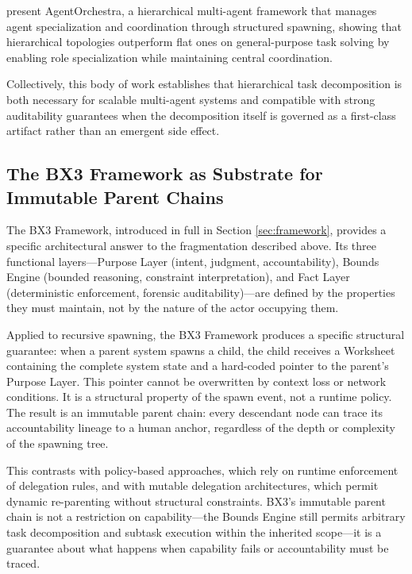  present AgentOrchestra, a hierarchical multi-agent framework that manages agent specialization and coordination through structured spawning, showing that hierarchical topologies outperform flat ones on general-purpose task solving by enabling role specialization while maintaining central coordination.

Collectively, this body of work establishes that hierarchical task decomposition is both necessary for scalable multi-agent systems and compatible with strong auditability guarantees when the decomposition itself is governed as a first-class artifact rather than an emergent side effect.

\subsection{The BX3 Framework as Substrate for Immutable Parent Chains}
\label{sec:bx3-substrate}

The BX3 Framework, introduced in full in Section \ref{sec:framework}, provides a specific architectural answer to the fragmentation described above. Its three functional layers---Purpose Layer (intent, judgment, accountability), Bounds Engine (bounded reasoning, constraint interpretation), and Fact Layer (deterministic enforcement, forensic auditability)---are defined by the properties they must maintain, not by the nature of the actor occupying them.

Applied to recursive spawning, the BX3 Framework produces a specific structural guarantee: when a parent system spawns a child, the child receives a Worksheet containing the complete system state and a hard-coded pointer to the parent's Purpose Layer. This pointer cannot be overwritten by context loss or network conditions. It is a structural property of the spawn event, not a runtime policy. The result is an immutable parent chain: every descendant node can trace its accountability lineage to a human anchor, regardless of the depth or complexity of the spawning tree.

This contrasts with policy-based approaches, which rely on runtime enforcement of delegation rules, and with mutable delegation architectures, which permit dynamic re-parenting without structural constraints. BX3's immutable parent chain is not a restriction on capability---the Bounds Engine still permits arbitrary task decomposition and subtask execution within the inherited scope---it is a guarantee about what happens when capability fails or accountability must be traced.

